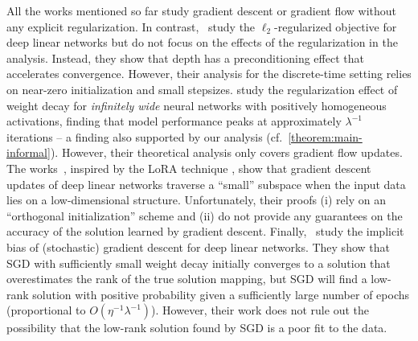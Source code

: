 All the works mentioned so far study gradient descent or gradient flow
without any explicit regularization.
In contrast,~\citet{ACH18} study the $\ell_2$-regularized objective for deep linear networks but do not focus on the effects of the regularization in the analysis. Instead, they show that depth has a preconditioning effect that accelerates convergence. However, their analysis for the discrete-time setting relies on
near-zero initialization and small stepsizes.
\citet{lewkowycz2020training} study the regularization effect of
weight decay for \emph{infinitely wide} neural networks with positively homogeneous activations, finding that model performance peaks at approximately
$\lambda^{-1}$ iterations -- a finding also supported by our analysis (cf.~\cref{theorem:main-informal}). However, their theoretical analysis only covers
gradient flow updates. The works~\cite{YWH+23,yaras2024compressible}, inspired
by the LoRA technique \cite{hu2021lora}, show that gradient descent updates of deep linear networks traverse a ``small'' subspace when
the input data lies on a low-dimensional structure. Unfortunately, their proofs
(i) rely on an ``orthogonal initialization'' scheme and (ii) do not provide any
guarantees on the accuracy of the solution learned by gradient descent.
Finally,~\citet{wang2024implicit} study the implicit bias of (stochastic) gradient
descent for deep linear networks. They show that SGD with sufficiently small
weight decay initially converges to a solution that overestimates the rank of
the true solution mapping, but SGD will find a low-rank solution
with positive probability given a sufficiently large number of epochs (proportional to $O(\eta^{-1} \lambda^{-1})$). However, their work does not rule out the possibility that
the low-rank solution found by SGD is
a poor fit to the data.




